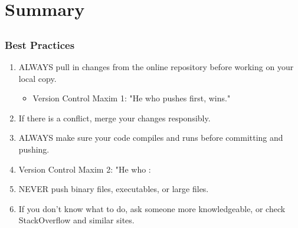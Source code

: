 \documentclass[]{beamer}
\begin{document}
\section{Summary}
\subsection{}
\begin{frame}[t]\frametitle{Best Practices}
  \begin{block}{}
    \begin{enumerate}
      \item ALWAYS pull in changes from the online repository before working on your local copy. 
        \begin{itemize}
          \item Version Control Maxim 1: "He who pushes first, wins."
        \end{itemize}
      \item If there is a conflict, merge your changes responsibly.
      \item ALWAYS make sure your code compiles and runs before committing and pushing.
         \item Version Control Maxim 2: "He who : 
      \item NEVER push binary files, executables, or large files. 
      \item If you don't know what to do, ask someone more knowledgeable, or check StackOverflow and similar sites.
    \end{enumerate}
  \end{block}
\end{frame}
\end{document}

